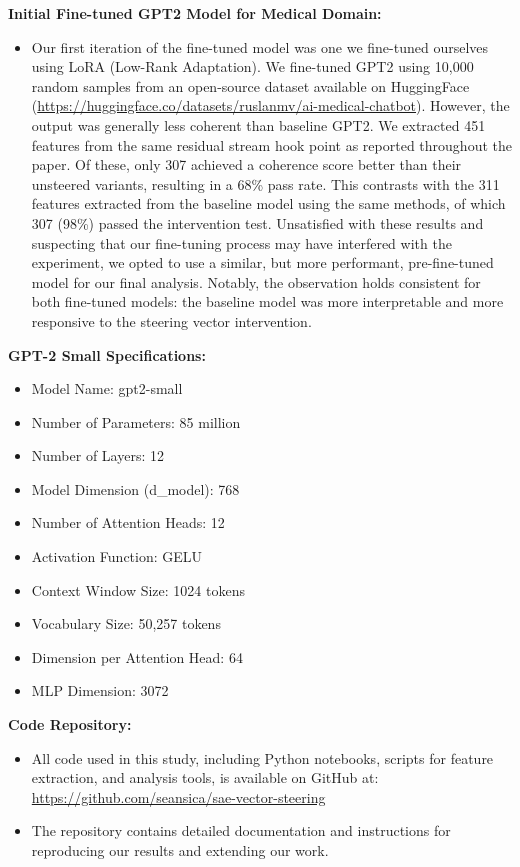 \hypertarget{old-finetuned-results}{%
\textbf{Initial Fine-tuned GPT2 Model for Medical Domain:}
\begin{itemize}
    \item Our first iteration of the fine-tuned model was one we fine-tuned ourselves using LoRA (Low-Rank Adaptation). We fine-tuned GPT2 using 10,000 random samples from an open-source dataset available on HuggingFace (\url{https://huggingface.co/datasets/ruslanmv/ai-medical-chatbot}). However, the output was generally less coherent than baseline GPT2. We extracted 451 features from the same residual stream hook point as reported throughout the paper. Of these, only 307 achieved a coherence score better than their unsteered variants, resulting in a 68\% pass rate. This contrasts with the 311 features extracted from the baseline model using the same methods, of which 307 (98\%) passed the intervention test. Unsatisfied with these results and suspecting that our fine-tuning process may have interfered with the experiment, we opted to use a similar, but more performant, pre-fine-tuned model for our final analysis. Notably, the observation holds consistent for both fine-tuned models: the baseline model was more interpretable and more responsive to the steering vector intervention.
\end{itemize}
}

\hypertarget{gpt2-specs}{%
\textbf{GPT-2 Small Specifications:} 
\begin{itemize}
    \item Model Name: gpt2-small
    \item Number of Parameters: 85 million
    \item Number of Layers: 12
    \item Model Dimension (d\_model): 768
    \item Number of Attention Heads: 12
    \item Activation Function: GELU
    \item Context Window Size: 1024 tokens
    \item Vocabulary Size: 50,257 tokens
    \item Dimension per Attention Head: 64
    \item MLP Dimension: 3072
\end{itemize}
}

\hypertarget{code-repository}{%
\textbf{Code Repository:} 
\begin{itemize}
    \item All code used in this study, including Python notebooks, scripts for feature extraction, and analysis tools, is available on GitHub at:
    \url{https://github.com/seansica/sae-vector-steering}
    \item The repository contains detailed documentation and instructions for reproducing our results and extending our work.
\end{itemize}
}

